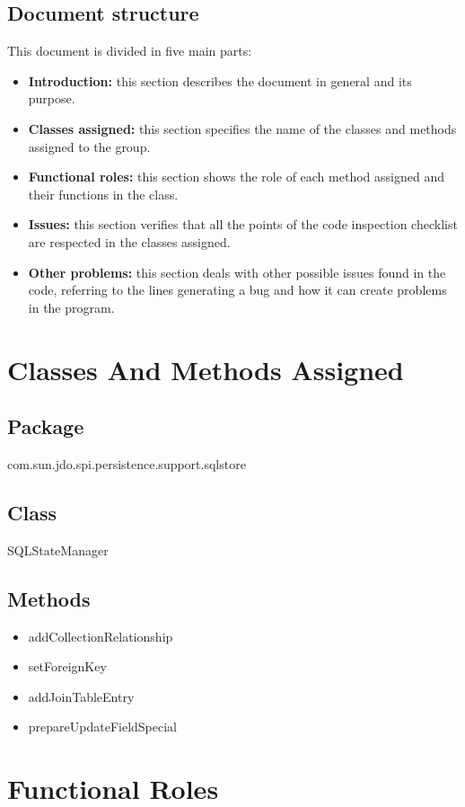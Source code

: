 \documentclass[18pt,oneside,a4paper, titlepage]{article}
\begin{document}
	\subsection{Document structure}
		This document is divided in five main parts:
		\begin{itemize}
			\item \textbf{Introduction:} this section describes the document in general and its purpose.
			\item  \textbf{Classes assigned:} this section specifies the name of the classes and methods assigned to the group.
			\item  \textbf{Functional roles:} this section shows the role of each method assigned and their functions in the class.
			\item  \textbf{Issues:} this section verifies that all the points of the code inspection checklist are respected in the classes assigned.
			\item  \textbf{Other problems:} this section deals with other possible issues found in the code, referring to the lines generating a bug and how it can create problems in the program.
		\end{itemize}

\newpage	
\section{Classes And Methods Assigned}
	\subsection{Package}
		com.sun.jdo.spi.persistence.support.sqlstore
	\subsection{Class}
		SQLStateManager
	\subsection{Methods}
		\begin{itemize}
			\item addCollectionRelationship
			\item setForeignKey
			\item addJoinTableEntry
			\item prepareUpdateFieldSpecial
		\end{itemize}
		
\newpage
\section{Functional Roles}
\end{document}
